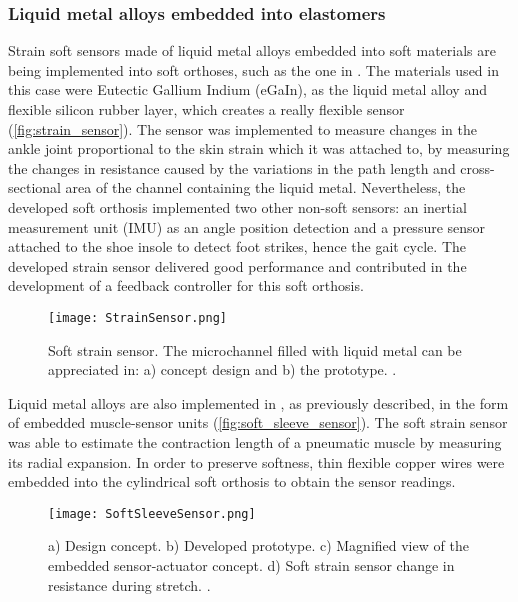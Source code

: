 \subsubsection{Liquid metal alloys embedded into elastomers}

Strain soft sensors made of liquid metal alloys embedded into soft materials are being implemented into soft orthoses, such as the one in \cite{park2011bio}. The materials used in this case were Eutectic Gallium Indium (eGaIn), as the liquid metal alloy and flexible silicon rubber layer, which creates a really flexible sensor (\autoref{fig:strain_sensor}). The sensor was implemented to measure changes in the ankle joint proportional to the skin strain which it was attached to, by measuring the changes in resistance caused by the variations in the path length and cross-sectional area of the channel containing the liquid metal. Nevertheless, the developed soft orthosis implemented two other non-soft sensors: an inertial measurement unit (IMU) as an angle position detection and a pressure sensor attached to the shoe insole to detect foot strikes, hence the gait cycle. The developed strain sensor delivered good performance and contributed in the development of a feedback controller for this soft orthosis.

\begin{figure}[hbtp!]
    \centering
    \texttt{[image: StrainSensor.png]}
    \caption{Soft strain sensor. The microchannel filled with liquid metal can be appreciated in: a) concept design and b) the prototype. \cite{park2011bio}. }
    \label{fig:strain_sensor}
\end{figure}

Liquid metal alloys are also implemented in \cite{Park2012}, as previously described, in the form of embedded muscle-sensor units (\autoref{fig:soft_sleeve_sensor}). The soft strain sensor was able to estimate the contraction length of a pneumatic muscle by measuring its radial expansion. In order to preserve softness, thin flexible copper wires were embedded into the cylindrical soft orthosis to obtain the sensor readings.

\begin{figure}[hbtp!]
    \centering
    \texttt{[image: SoftSleeveSensor.png]}
    \caption{a) Design concept. b) Developed prototype. c) Magnified view of the embedded sensor-actuator concept. d) Soft strain sensor change in resistance during stretch. \cite{Park2012}. }
    \label{fig:soft_sleeve_sensor}
\end{figure}

